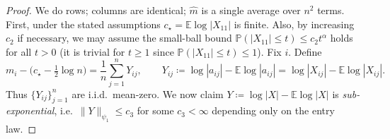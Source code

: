 \documentclass[11pt,a4paper]{article}
\newcommand{\Prob}{\mathbb{P}}
\newcommand{\E}{\mathbb{E}}
\begin{document}
\begin{proof}
We do rows; columns are identical; $\hat{m}$ is a single average over $n^2$ terms. First, under the stated assumptions $c_\star=\E\log|X_{11}|$ is finite. Also, by increasing $c_2$ if necessary, we may assume the small-ball bound $\Prob(|X_{11}|\le t)\le c_2 t^\alpha$ holds for all $t>0$ (it is trivial for $t\ge1$ since $\Prob(|X_{11}|\le t)\le 1$).  Fix $i$. Define
\begin{equation}\label{def:of-y}
m_i-\Big(c_\star-\tfrac12\log n\Big)=\frac1n\sum_{j=1}^n Y_{ij},\qquad
Y_{ij}\coloneq \log|a_{ij}|-\E\log|a_{ij}|=\log|X_{ij}|-\E\log|X_{ij}|.
\end{equation}
Thus $\{Y_{ij}\}_{j=1}^n$ are i.i.d.\ mean-zero. We now claim $Y\coloneq \log|X|-\E\log|X|$ is \emph{sub-exponential}, i.e.\ $\|Y\|_{\psi_1}\le c_3$ for some $c_3<\infty$ depending only on the entry law.


\end{proof}
\end{document}
